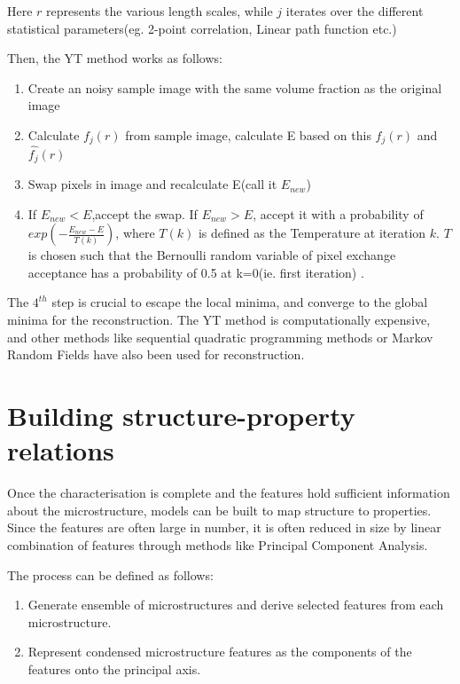 \documentclass[12pt, a4paper]{report}
\begin{document}
Here $r$ represents the various length scales, while $j$ iterates over the different statistical parameters(eg. 2-point correlation, Linear path function etc.)

Then, the YT method works as follows:

\begin{enumerate}
    \item Create an noisy sample image with the same volume fraction as the original image
    \item Calculate $f_j(r)$ from sample image, calculate E based on this $f_j(r)$ and $\hat{f_j}(r)$
    \item Swap pixels in image and recalculate E(call it $E_{new}$)
    \item If $E_{new} < E$,accept the swap. If $E_{new} > E$, accept it with a probability of $exp(-\frac{E_{new}-E}{T(k)})$, where $T(k)$ is defined as the Temperature at iteration $k$. $T$ is chosen such that the Bernoulli random variable of pixel exchange acceptance has a probability of 0.5 at k=0(ie. first iteration) \cite{13yeong1998reconstructing}.
\end{enumerate}

The $4^{th}$ step is crucial to escape the local minima, and converge to the global minima for the reconstruction. The YT method is computationally expensive, and other methods like sequential quadratic programming methods \cite{12fullwood2008gradient} or Markov Random Fields \cite{8liu2015random} have also been used for reconstruction.

\section{Building structure-property relations}

Once the characterisation is complete and the features hold sufficient information about the microstructure, models can be built to map structure to properties. Since the features are often large in number, it is often reduced in size by linear combination of features through methods like Principal Component Analysis.

The process can be defined as follows:

\begin{enumerate}
    \item Generate ensemble of microstructures and derive selected features from each microstructure.
    \item Represent condensed microstructure features as the components of the features onto the principal axis.
\end{enumerate}
\end{document}
